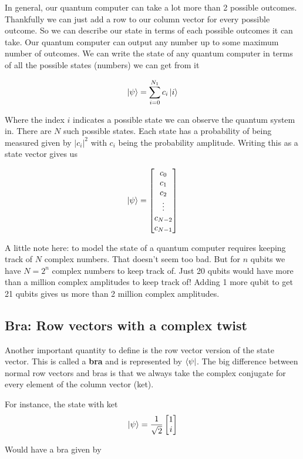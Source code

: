 In general, our quantum computer can take a lot more than 2 possible outcomes. Thankfully we can just add a row to our column vector for every possible outcome. So we can describe our state in terms of each possible outcomes it can take. Our quantum computer can output any number up to some maximum number of outcomes.  We can write the state of any quantum computer in terms of all the possible states (numbers) we can get from it

$$ \ket{\psi} = \sum_{i = 0}^{N_1} c_i \ket{i}$$

Where the index $i$ indicates a possible state we can observe the quantum system in. There are $N$ such possible states. Each state has a probability of being measured given by $|c_i|^2$  with $c_i$ being the probability amplitude. Writing this as a state vector gives us 

$$ \ket{\psi} = \begin{bmatrix} c_0 \\ c_1 \\ c_2 \\ \vdots \\ c_{N-2} \\ c_{N-1} \end{bmatrix} $$

A little note here: to model the state of a quantum computer requires keeping track of $N$ complex numbers. That doesn't seem too bad.  But for $n$ qubits we have $N = 2^n$ complex numbers to keep track of. Just 20 qubits would have more than a million complex amplitudes to keep track of! Adding 1 more qubit to get 21 qubits gives us more than 2 million complex amplitudes. 

\subsection{ Bra: Row vectors with a complex twist }

Another important quantity to define is the row vector version of the state vector. This is called a \textbf{bra} and is represented by $\bra{\psi}$. The big difference between normal row vectors and bras is that we always take the complex conjugate for every element of the column vector (ket). 

For instance, the state with ket
$$\ket{\psi} = \frac{1}{\sqrt{2}} \begin{bmatrix} 1 \\ i \end{bmatrix} $$

Would have a bra given by 

